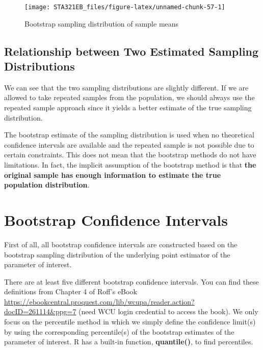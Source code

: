 \documentclass[
]{book}
\begin{document}
\begin{figure}

{\centering \texttt{[image: STA321EB\_files/figure-latex/unnamed-chunk-57-1]} 

}

\caption{Bootstrap sampling distribution of sample means}\label{fig:unnamed-chunk-57}
\end{figure}

\hypertarget{relationship-between-two-estimated-sampling-distributions}{%
\subsection{Relationship between Two Estimated Sampling Distributions}\label{relationship-between-two-estimated-sampling-distributions}}

We can see that the two sampling distributions are slightly different. If we are allowed to take repeated samples from the population, we should always use the repeated sample approach since it yields a better estimate of the true sampling distribution.

The bootstrap estimate of the sampling distribution is used when no theoretical confidence intervals are available and the repeated sample is not possible due to certain constraints. This does not mean that the bootstrap methods do not have limitations. In fact, the implicit assumption of the bootstrap method is that \textbf{the original sample has enough information to estimate the true population distribution}.

\hypertarget{bootstrap-confidence-intervals-1}{%
\section{Bootstrap Confidence Intervals}\label{bootstrap-confidence-intervals-1}}

First of all, all bootstrap confidence intervals are constructed based on the bootstrap sampling distribution of the underlying point estimator of the parameter of interest.

There are at least five different bootstrap confidence intervals. You can find these definitions from Chapter 4 of Roff's eBook \url{https://ebookcentral.proquest.com/lib/wcupa/reader.action?docID=261114\&ppg=7} (need WCU login credential to access the book). We only focus on the percentile method in which we simply define the confidence limit(s) by using the corresponding percentile(s) of the bootstrap estimates of the parameter of interest. R has a built-in function, \textbf{quantile()}, to find percentiles.
\end{document}
